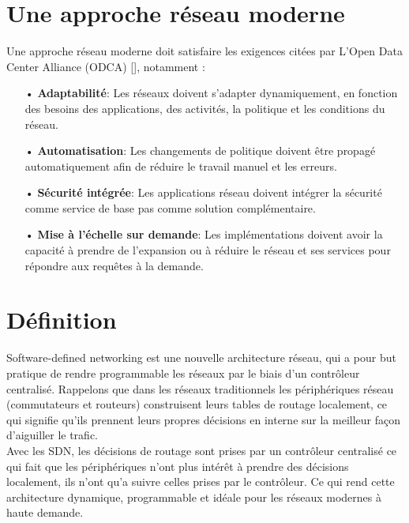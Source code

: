 \newpage
\section{Une approche réseau moderne}
Une approche réseau moderne doit satisfaire les exigences citées par L’Open Data Center Alliance (ODCA)  [\cite{2}], notamment :\\
\begin{itemize}
\item[•] \textbf{Adaptabilité}: Les réseaux doivent s’adapter dynamiquement, en fonction des besoins des applications, des activités, la politique et les conditions du réseau.\\
\item[•] \textbf{Automatisation}: Les changements de politique doivent être propagé automatiquement afin de réduire le travail manuel et les erreurs.\\
\item[•] \textbf{Sécurité intégrée}: Les applications réseau doivent intégrer la sécurité comme service de base pas comme solution complémentaire.\\
\item[•] \textbf{Mise à l’échelle sur demande}: Les implémentations doivent avoir la capacité à prendre de l’expansion ou à réduire le réseau et ses services pour répondre aux requêtes à la demande.
\end{itemize}


\section{Définition}

Software-defined networking est une nouvelle architecture réseau, qui a pour but pratique de rendre programmable les réseaux par le biais d’un contrôleur centralisé. Rappelons que dans les réseaux traditionnels les périphériques réseau (commutateurs et routeurs) construisent leurs tables de routage localement, ce qui signifie qu’ils prennent leurs propres décisions en interne sur la meilleur façon d’aiguiller le trafic. \\

Avec les SDN, les décisions de routage sont prises par un contrôleur centralisé ce qui fait que les périphériques n’ont plus intérêt à prendre des décisions localement, ils n’ont qu’a suivre celles prises par le contrôleur. Ce qui rend cette architecture dynamique, programmable et idéale pour les réseaux modernes à haute demande.

